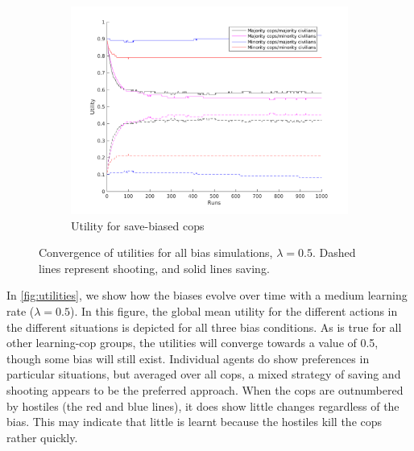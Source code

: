 \begin{figure}[H]
\begin{subfigure}[b]{0.62\textwidth}
        \includegraphics[width=\textwidth]{./pictures/Utility05BiasSave}
        \caption{Utility for save-biased cops }
        \label{fig:utSave}
    \end{subfigure}
\caption{Convergence of utilities for all bias simulations, $\lambda = 0.5$. Dashed lines represent shooting, and solid lines saving. }
\label{fig:utilities}
\end{figure}
In \autoref{fig:utilities}, we show how the biases evolve over time with a medium learning rate ($\lambda = 0.5$). In this figure, the global mean utility for the different actions in the different situations is depicted for all three bias conditions. As is true for all other learning-cop groups, the utilities will converge towards a value of 0.5, though some bias will still exist. Individual agents do show preferences in particular situations, but averaged over all cops, a mixed strategy of saving and shooting appears to be the preferred approach. When the cops are outnumbered by hostiles (the red and blue lines), it does show little changes regardless of the bias. This may indicate that little is learnt because the hostiles kill the cops rather quickly. 

